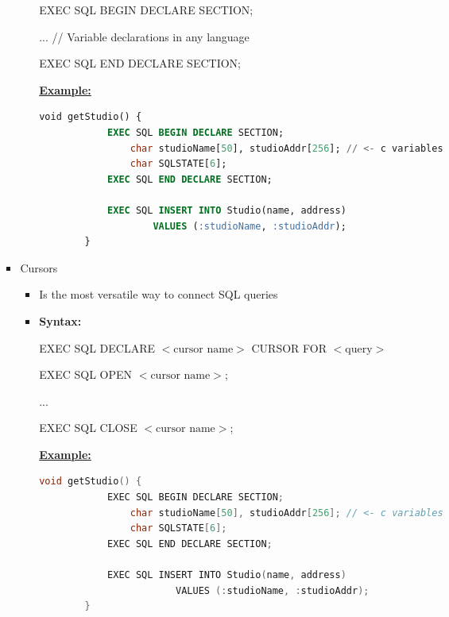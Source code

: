 \documentclass[12pt]{article}
\begin{document}
\begin{enumerate}[1.]
\begin{enumerate}[a)]
\begin{itemize}
\begin{itemize}
                EXEC SQL BEGIN DECLARE SECTION;

                ... // Variable declarations in any language

                EXEC SQL END DECLARE SECTION;

                \bigskip

                \underline{\textbf{Example:}}

                \bigskip

        \begin{lstlisting}[language=SQL]
        void getStudio() {
            EXEC SQL BEGIN DECLARE SECTION;
                char studioName[50], studioAddr[256]; // <- c variables
                char SQLSTATE[6];
            EXEC SQL END DECLARE SECTION;

            EXEC SQL INSERT INTO Studio(name, address)
                    VALUES (:studioName, :studioAddr);
        }
        \end{lstlisting}
            \end{itemize}

            \item Cursors
            \begin{itemize}
                \item Is the most versatile way to connect SQL queries
                \item \textbf{Syntax:}

                EXEC SQL DECLARE $<\text{cursor name}>$ CURSOR FOR $<\text{query}>$

                \bigskip

                EXEC SQL OPEN $<\text{cursor name}>$;

                ...

                EXEC SQL CLOSE $<\text{cursor name}>$;

                \bigskip

                \underline{\textbf{Example:}}

                \bigskip

        \begin{lstlisting}[language=c]
        void getStudio() {
            EXEC SQL BEGIN DECLARE SECTION;
                char studioName[50], studioAddr[256]; // <- c variables
                char SQLSTATE[6];
            EXEC SQL END DECLARE SECTION;

            EXEC SQL INSERT INTO Studio(name, address)
                        VALUES (:studioName, :studioAddr);
        }
        \end{lstlisting}


\end{itemize}
\end{itemize}
\end{enumerate}
\end{enumerate}
\end{document}
